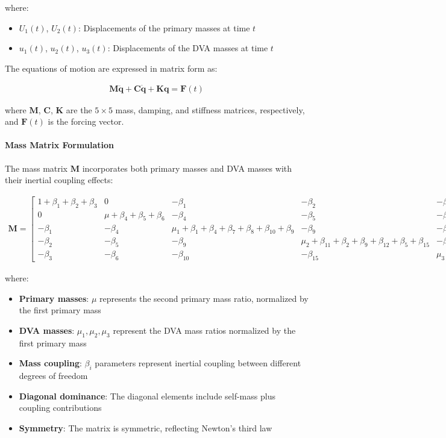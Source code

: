 \documentclass[12pt,a4paper]{article}
\begin{document}
where:
\begin{itemize}
    \item $U_1(t)$, $U_2(t)$: Displacements of the primary masses at time $t$
    \item $u_1(t)$, $u_2(t)$, $u_3(t)$: Displacements of the DVA masses at time $t$
\end{itemize}

The equations of motion are expressed in matrix form as:

\begin{align}\label{Eq.EOM.2dof3dof}
    \mathbf{M} \ddot{\mathbf{q}} + \mathbf{C} \dot{\mathbf{q}} + \mathbf{K} \mathbf{q} = \mathbf{F}(t)
\end{align}

where $\mathbf{M}$, $\mathbf{C}$, $\mathbf{K}$ are the $5 \times 5$ mass, damping, and stiffness matrices, respectively, and $\mathbf{F}(t)$ is the forcing vector.

\paragraph{Mass Matrix Formulation}

The mass matrix $\mathbf{M}$ incorporates both primary masses and DVA masses with their inertial coupling effects:

\begin{align}\label{Eq.mass.matrix.2dof3dof}
    \mathbf{M} = \begin{bmatrix}
        1 + \beta_1 + \beta_2 + \beta_3 & 0 & -\beta_1 & -\beta_2 & -\beta_3 \\
        0 & \mu + \beta_4 + \beta_5 + \beta_6 & -\beta_4 & -\beta_5 & -\beta_6 \\
        -\beta_1 & -\beta_4 & \mu_1 + \beta_1 + \beta_4 + \beta_7 + \beta_8 + \beta_{10} + \beta_9 & -\beta_9 & -\beta_{10} \\
        -\beta_2 & -\beta_5 & -\beta_9 & \mu_2 + \beta_{11} + \beta_2 + \beta_9 + \beta_{12} + \beta_5 + \beta_{15} & -\beta_{15} \\
        -\beta_3 & -\beta_6 & -\beta_{10} & -\beta_{15} & \mu_3 + \beta_{14} + \beta_6 + \beta_{13} + \beta_3 + \beta_{15} + \beta_{10}
    \end{bmatrix}
\end{align}

where:
\begin{itemize}
    \item \textbf{Primary masses}: $\mu$ represents the second primary mass ratio, normalized by the first primary mass
    \item \textbf{DVA masses}: $\mu_1, \mu_2, \mu_3$ represent the DVA mass ratios normalized by the first primary mass
    \item \textbf{Mass coupling}: $\beta_i$ parameters represent inertial coupling between different degrees of freedom
    \item \textbf{Diagonal dominance}: The diagonal elements include self-mass plus coupling contributions
    \item \textbf{Symmetry}: The matrix is symmetric, reflecting Newton's third law
\end{itemize}
\end{document}
